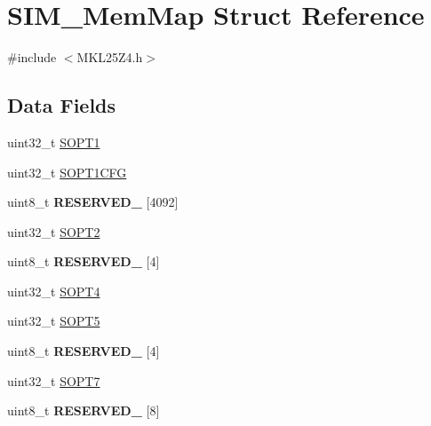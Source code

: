 \hypertarget{struct_s_i_m___mem_map}{}\section{S\+I\+M\+\_\+\+Mem\+Map Struct Reference}
\label{struct_s_i_m___mem_map}


{\ttfamily \#include $<$M\+K\+L25\+Z4.\+h$>$}

\subsection*{Data Fields}
\begin{DoxyCompactItemize}
\item 
uint32\+\_\+t \hyperlink{struct_s_i_m___mem_map_a1152a6ef88c78e762df97badf10b5050}{S\+O\+P\+T1}
\item 
uint32\+\_\+t \hyperlink{struct_s_i_m___mem_map_a9b6ea6819e80eeaa90754b6e91fcc808}{S\+O\+P\+T1\+C\+FG}
\item 
\mbox{\label{struct_s_i_m___mem_map_afaf8190e210f8ed4ae7309c0ef700304}} 
uint8\+\_\+t {\bfseries R\+E\+S\+E\+R\+V\+E\+D\+\_} \mbox{[}4092\mbox{]}
\item 
uint32\+\_\+t \hyperlink{struct_s_i_m___mem_map_ae4c4bf827aeca9c2de082cdfafdea3d1}{S\+O\+P\+T2}
\item 
\mbox{\label{struct_s_i_m___mem_map_ae97b8ef108928032cc6070216fec02ec}} 
uint8\+\_\+t {\bfseries R\+E\+S\+E\+R\+V\+E\+D\+\_} \mbox{[}4\mbox{]}
\item 
uint32\+\_\+t \hyperlink{struct_s_i_m___mem_map_adf28cda65cea7072379ec6064d0d93cc}{S\+O\+P\+T4}
\item 
uint32\+\_\+t \hyperlink{struct_s_i_m___mem_map_a19e2ddf391b1d9c03240be8267fdf781}{S\+O\+P\+T5}
\item 
\mbox{\label{struct_s_i_m___mem_map_a291f9d8d1d4e3f8a94668f14592402b0}} 
uint8\+\_\+t {\bfseries R\+E\+S\+E\+R\+V\+E\+D\+\_} \mbox{[}4\mbox{]}
\item 
uint32\+\_\+t \hyperlink{struct_s_i_m___mem_map_a04a22056fd7d08179705d29cda1b9e2a}{S\+O\+P\+T7}
\item 
\mbox{\label{struct_s_i_m___mem_map_a581c4826706d6c336d1847b83d3dd89a}} 
uint8\+\_\+t {\bfseries R\+E\+S\+E\+R\+V\+E\+D\+\_} \mbox{[}8\mbox{]}

\end{DoxyCompactItemize}
